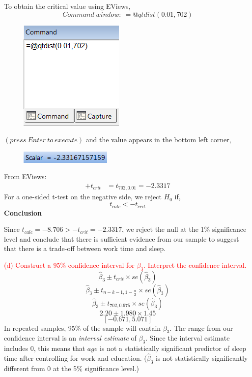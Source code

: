 \documentclass[12pt]{report}
\begin{document}
\noindent To obtain the critical value using EViews,
$$Command\ window:\ =@qtdist(0.01,702)$$
\begin{figure}[H]
	\centering
	\includegraphics{tute6_q2_5}
\end{figure}
\vspace{-\baselineskip}\centering $(press\ Enter\ to\ execute)$
\justify and the value appears in the bottom left corner,
\begin{figure}[H]
	\centering
	\includegraphics{tute6_q2_6}
\end{figure}
\vspace{-\baselineskip}
\noindent From EViews: \begin{align*}
+t_{crit} &= t_{702,0.01} = -2.3317
\end{align*}
\noindent For a one-sided t-test on the negative side, we reject $H_0$ if,
$$t_{calc} < -t_{crit}$$
\noindent \textbf{Conclusion}

\noindent Since $t_{calc} = -8.706 > -t_{crit} = -2.3317$, we reject the null at the 1\% significance level and conclude that there is sufficient evidence from our sample to suggest that there is a trade-off between work time and sleep.

\noindent \textcolor{red}{(d) Construct a 95\% confidence interval for $\beta_3$. Interpret the confidence interval.}
$$\hat{\beta}_3 \pm t_{crit} \times se(\hat{\beta}_3)$$
$$\hat{\beta}_3 \pm t_{n-k-1,1-\frac{\alpha}{2}} \times se(\hat{\beta}_3)$$
$$\hat{\beta}_3 \pm t_{702,0.975} \times se(\hat{\beta}_3)$$
$$2.20 \pm 1.980 \times 1.45$$
$$[-0.671,5.071]$$
\noindent In repeated samples, 95\% of the sample will contain $\beta_3$. The range from our confidence interval is an \textit{interval estimate} of $\beta_3$. Since the interval estimate includes $0$, this means that $age$ is not a statistically significant predictor of sleep time after controlling for work and education. ($\hat{\beta}_3$ is not statistically significantly different from 0 at the 5\% significance level.)
\end{document}
